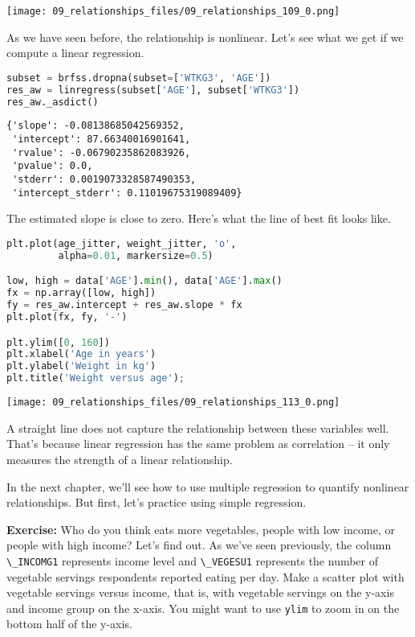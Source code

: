 \begin{center}
\texttt{[image: 09\_relationships\_files/09\_relationships\_109\_0.png]}
\end{center}

As we have seen before, the relationship is nonlinear. Let's see what we
get if we compute a linear regression.

\begin{lstlisting}[language=Python,style=source]
subset = brfss.dropna(subset=['WTKG3', 'AGE'])
res_aw = linregress(subset['AGE'], subset['WTKG3'])
res_aw._asdict()
\end{lstlisting}

\begin{lstlisting}[style=output]
{'slope': -0.08138685042569352,
 'intercept': 87.66340016901641,
 'rvalue': -0.06790235862083926,
 'pvalue': 0.0,
 'stderr': 0.0019073328587490353,
 'intercept_stderr': 0.11019675319089409}
\end{lstlisting}

The estimated slope is close to zero. Here's what the line of best fit
looks like.

\begin{lstlisting}[language=Python,style=source]
plt.plot(age_jitter, weight_jitter, 'o',
         alpha=0.01, markersize=0.5)

low, high = data['AGE'].min(), data['AGE'].max()
fx = np.array([low, high])
fy = res_aw.intercept + res_aw.slope * fx
plt.plot(fx, fy, '-')

plt.ylim([0, 160])
plt.xlabel('Age in years')
plt.ylabel('Weight in kg')
plt.title('Weight versus age');
\end{lstlisting}

\begin{center}
\texttt{[image: 09\_relationships\_files/09\_relationships\_113\_0.png]}
\end{center}

A straight line does not capture the relationship between these
variables well. That's because linear regression has the same problem as
correlation -- it only measures the strength of a linear relationship.

In the next chapter, we'll see how to use multiple regression to
quantify nonlinear relationships. But first, let's practice using
simple regression.

\textbf{Exercise:} Who do you think eats more vegetables, people with
low income, or people with high income? Let's find out. As we've seen
previously, the column \passthrough{\lstinline!\_INCOMG1!} represents
income level and \passthrough{\lstinline!\_VEGESU1!} represents the
number of vegetable servings respondents reported eating per day. Make a
scatter plot with vegetable servings versus income, that is, with
vegetable servings on the y-axis and income group on the x-axis. You
might want to use \passthrough{\lstinline!ylim!} to zoom in on the
bottom half of the y-axis.

